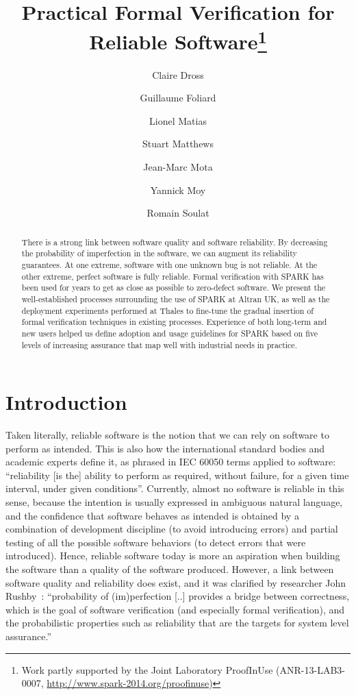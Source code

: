 \documentclass{llncs}
\title{Practical Formal Verification for Reliable Software\thanks{Work partly
supported by the Joint Laboratory ProofInUse (ANR-13-LAB3-0007,
\url{http://www.spark-2014.org/proofinuse})}}
\author{Claire Dross\inst{1} \and Guillaume Foliard\inst{2} \and Lionel
  Matias\inst{2} \and Stuart Matthews\inst{3} \and Jean-Marc Mota\inst{4} \and
  Yannick Moy\inst{1} \and Romain Soulat\inst{4}}
\institute{AdaCore, F-75009 Paris \and Thales Air Systems, F-91470 Limours \and
  Altran, Bath BA1 1AN, United Kingdom \and Thales Research \& Technologies,
  F-91767 Palaiseau}
\date{}
\begin{document}
\sloppy
{}
\maketitle

\begin{abstract}
There is a strong link between software quality and software reliability. By
decreasing the probability of imperfection in the software, we can augment its
reliability guarantees. At one extreme, software with one unknown bug is not
reliable. At the other extreme, perfect software is fully reliable. Formal
verification with SPARK has been used for years to get as close as possible to
zero-defect software. We present the well-established processes surrounding the
use of SPARK at Altran UK, as well as the deployment experiments performed at
Thales to fine-tune the gradual insertion of formal verification techniques in
existing processes.  Experience of both long-term and new users helped us
define adoption and usage guidelines for SPARK based on five levels of
increasing assurance that map well with industrial needs in practice.
\end{abstract}


\section{Introduction}

Taken literally, reliable software is the notion that we can rely on software
to perform as intended. This is also how the international standard bodies and
academic experts define it, as phrased in IEC 60050 terms applied to software:
``reliability [is the] ability to perform as required, without failure, for a
given time interval, under given conditions''. Currently, almost no software is
reliable in this sense, because the intention is usually expressed in ambiguous
natural language, and the confidence that software behaves as intended is
obtained by a combination of development discipline (to avoid introducing
errors) and partial testing of all the possible software behaviors (to detect
errors that were introduced). Hence, reliable software today is more an
aspiration when building the software than a quality of the software produced.
However, a link between software quality and reliability does exist, and it was
clarified by researcher John Rushby~\cite{RushbySEFM2009}: ``probability of
(im)perfection [..]  provides a bridge between correctness, which is the goal
of software verification (and especially formal verification), and the
probabilistic properties such as reliability that are the targets for system
level assurance.''
\end{document}
